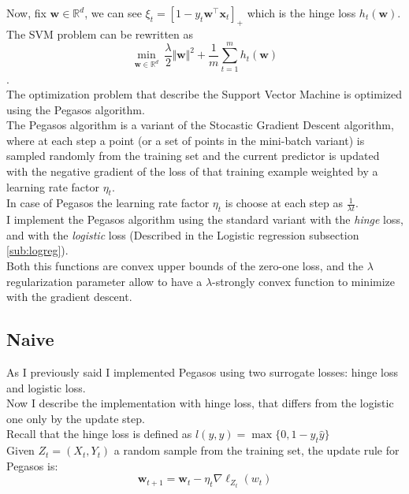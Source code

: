 Now, fix $\boldsymbol{w} \in \mathbb{R}^d$, we can see $\xi_t = \left[1 - y_t \boldsymbol{w}^\top \boldsymbol{x}_t \right]_+$ which is the hinge loss  $h_{t}(\boldsymbol{w})$.\\

The SVM problem can be rewritten as $$\underset{\boldsymbol{w} \in \mathbb{R}^d}{\min} \ \frac{\lambda}{2} \Vert \boldsymbol{w} \Vert^2 + \frac{1}{m} \sum_{t = 1}^m h_{t}(\boldsymbol{w})$$.\\

The optimization problem that describe the Support Vector Machine is optimized using the Pegasos algorithm.\\
The Pegasos algorithm is a variant of the Stocastic Gradient Descent algorithm, where at each step a point (or a set of points in the mini-batch variant) is sampled randomly from the training set
and the current predictor is updated with the negative gradient of the loss of that training example weighted by a learning rate factor $\eta_t$.\\
In case of Pegasos the learning rate factor $\eta_t$ is choose at each step as $\frac{1}{\lambda t}$.\\
I implement the Pegasos algorithm using the standard variant with the \textit{hinge} loss, and with the \textit{logistic} loss (Described in the Logistic regression subsection \ref{sub:logreg}).\\
Both this functions are convex upper bounds of the zero-one loss, and the $\lambda$ regularization parameter allow to have a $\lambda$-strongly convex function to minimize with the gradient descent.\\

\subsection{Naive}
As I previously said I implemented Pegasos using two surrogate losses: hinge loss and logistic loss.\\
Now I describe the implementation with hinge loss, that differs from the logistic one only by the update step.\\ 
Recall that the hinge loss is defined as $l(y, \hat{y}) = \max\{0, 1 - y_t \hat{y}\}$\\
Given $Z_t = (X_t, Y_t)$ a random sample from the training set, the update rule for Pegasos is:\\
$$\boldsymbol{w}_{t+1} = \boldsymbol{w}_t - \eta_t \nabla\ell_{Z_t}(w_t)$$

